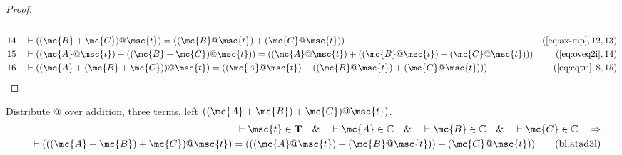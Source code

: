\begin{proof}
\begin{align}
  \\ 14 &&  & \vdash ( ( \mc{B} + \mc{C} ) @ \msc{t} ) = ( ( \mc{B} @ \msc{t} ) + ( \mc{C} @
     \msc{t} ) )&(\mbox{\ref{eq:ax-mp}},12,13)\notag
  \\ 15 &&  & \vdash ( ( \mc{A} @ \msc{t} ) + ( ( \mc{B} + \mc{C} ) @ \msc{t} ) ) = ( ( \mc{A} @
     \msc{t} ) + ( ( \mc{B} @ \msc{t} ) + ( \mc{C} @ \msc{t} ) )
     )&(\mbox{\ref{eq:oveq2i}},14)\notag
  \\ 16 &&  & \vdash ( ( \mc{A} + ( \mc{B} + \mc{C} ) ) @ \msc{t} ) = ( ( \mc{A} @ \msc{t} ) + ( (
     \mc{B} @ \msc{t} ) + ( \mc{C} @ \msc{t} ) )
     )&(\mbox{\ref{eq:eqtri}},8,15)\notag
\end{align}
\end{proof}

\begin{lemma} {Distribute @ over addition, three terms},
left $( ( \mc{A} + \mc{B} ) + \mc{C} ) @ \msc{t} )$.
\begin{align}
\vdash \msc{t} \in \mathbf{T}\quad\&\quad \vdash \mc{A} \in \mathbb{C}\quad\&\quad
    \vdash \mc{B} \in \mathbb{C}\quad\&\quad \vdash \mc{C} \in
    \mathbb{C}\quad\Rightarrow \notag \\
    \quad \vdash ( ( ( \mc{A} + \mc{B} ) + \mc{C} ) @ \msc{t} ) = (
    ( ( \mc{A} @ \msc{t} ) + ( \mc{B} @ \msc{t} ) ) + ( \mc{C} @ \msc{t} )
    )\label{eq:bl.atad3l}\tag{bl.atad3l}
\end{align}
\end{lemma}


